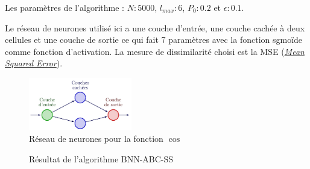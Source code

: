 \documentclass[french,12pt]{article}
\begin{document}
Les paramètres de l'algorithme : $N : 5000$, $l_{max} : 6$, $P_0 : 0.2$ et $\epsilon : 0.1$.

Le réseau de neurones utilisé ici a une couche d'entrée, une couche cachée à deux cellules et une couche de sortie ce qui
fait 7 paramètres avec la fonction sgmoïde comme fonction d'activation. La mesure de dissimilarité
choisi est la MSE (\href{https://en.wikipedia.org/wiki/Mean_squared_error}{\textit{Mean Squared Error}}).

\begin{figure}[H]
    \centering
    \includegraphics[width = 0.4\textwidth]{FNN/Images/fnnCos/fnnCos_page-0001.jpg}
    \caption[short]{Réseau de neurones pour la fonction $\cos$}
\end{figure}


\begin{figure}[H]
    \centering
    \caption[short]{Résultat de l'algorithme BNN-ABC-SS}
\end{figure}
\end{document}
